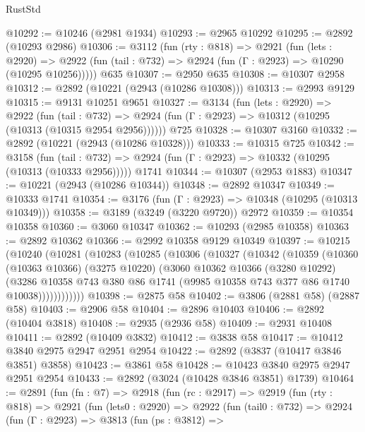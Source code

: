 \begin{lexlean}{RustStd}
\begin{coremodule}
@10292 := @10246 (@2981 @1934)
@10293 := @2965 @10292
@10295 := @2892 (@10293 @2986)
@10306 := @3112
    (fun (rty : @818) =>
    @2921
      (fun (lets : @2920) =>
      @2922 (fun (tail : @732) => @2924 (fun (Γ : @2923) => @10290 (@10295 @10256)))))
    @635
@10307 := @2950 @635
@10308 := @10307 @2958
@10312 := @2892 (@10221 (@2943 (@10286 @10308)))
@10313 := @2993 @9129
@10315 := @9131 @10251 @9651
@10327 := @3134
    (fun (lets : @2920) =>
    @2922
      (fun (tail : @732) =>
      @2924 (fun (Γ : @2923) => @10312 (@10295 (@10313 (@10315 @2954 @2956))))))
    @725
@10328 := @10307 @3160
@10332 := @2892 (@10221 (@2943 (@10286 @10328)))
@10333 := @10315 @725
@10342 := @3158
    (fun (tail : @732) => @2924 (fun (Γ : @2923) => @10332 (@10295 (@10313 (@10333 @2956)))))
    @1741
@10344 := @10307 (@2953 @1883)
@10347 := @10221 (@2943 (@10286 @10344))
@10348 := @2892 @10347
@10349 := @10333 @1741
@10354 := @3176 (fun (Γ : @2923) => @10348 (@10295 (@10313 @10349)))
@10358 := @3189 (@3249 (@3220 @9720)) @2972
@10359 := @10354 @10358
@10360 := @3060 @10347
@10362 := @10293 (@2985 @10358)
@10363 := @2892 @10362
@10366 := @2992 @10358 @9129 @10349
@10397 := @10215
    (@10240
      (@10281
        (@10283
          (@10285
            (@10306
              (@10327
                (@10342
                  (@10359
                    (@10360
                      (@10363 @10366)
                      (@3275 @10220)
                      (@3060
                        @10362
                        @10366
                        (@3280 @10292)
                        (@3286
                          @10358
                          @743
                          @380
                          @86
                          @1741
                          (@9985 @10358 @743 @377 @86 @1740 @10038))))))))))))
@10398 := @2875 @58
@10402 := @3806 (@2881 @58) (@2887 @58)
@10403 := @2906 @58
@10404 := @2896 @10403
@10406 := @2892 (@10404 @3818)
@10408 := @2935 (@2936 @58)
@10409 := @2931 @10408
@10411 := @2892 (@10409 @3832)
@10412 := @3838 @58
@10417 := @10412 @3840 @2975 @2947 @2951 @2954
@10422 := @2892 (@3837 (@10417 @3846 @3851) @3858)
@10423 := @3861 @58
@10428 := @10423 @3840 @2975 @2947 @2951 @2954
@10433 := @2892 (@3024 (@10428 @3846 @3851) @1739)
@10464 := @2891
    (fun (fn : @7) =>
    @2918
      (fun (rc : @2917) =>
      @2919
        (fun (rty : @818) =>
        @2921
          (fun (lets0 : @2920) =>
          @2922
            (fun (tail0 : @732) =>
            @2924
              (fun (Γ : @2923) =>
              @3813
                (fun (ps : @3812) =>

\end{coremodule}
\end{lexlean}
